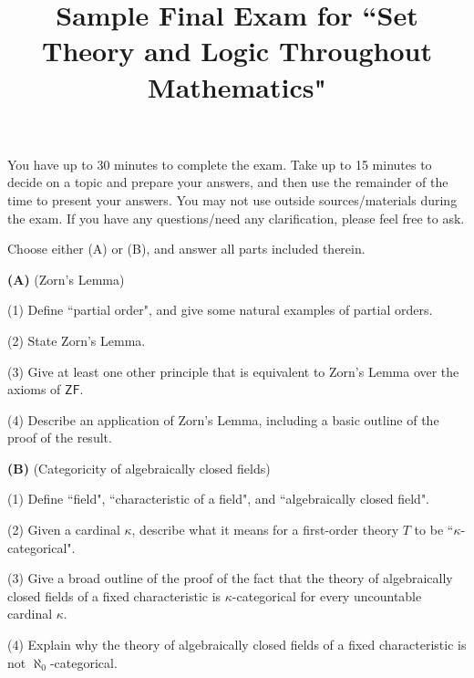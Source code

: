 \documentclass{amsart}
\begin{document}
\title{Sample Final Exam for ``Set Theory and Logic Throughout Mathematics"}
\maketitle

You have up to 30 minutes to complete the exam. Take up to 15 minutes to decide 
on a topic and prepare your answers, and then use the remainder of the time to 
present your answers. You may not use outside sources/materials during the exam.
If you have any questions/need any clarification, please feel free to ask.

\bigskip

Choose either (A) or (B), and answer all parts included therein.

\bigskip

\noindent \textbf{(A)} (Zorn's Lemma)

\smallskip

(1) Define ``partial order", and give some natural examples of partial orders.

\smallskip

(2) State Zorn's Lemma.

\smallskip

(3) Give at least one other principle that is equivalent to Zorn's Lemma over the axioms of $\mathsf{ZF}$.

\smallskip

(4) Describe an application of Zorn's Lemma, including a basic outline of the proof of the result.

\bigskip

\noindent \textbf{(B)} (Categoricity of algebraically closed fields)

\smallskip

(1) Define ``field", ``characteristic of a field", and ``algebraically closed field".

\smallskip

(2) Given a cardinal $\kappa$, describe what it means for a first-order theory $T$ to be 
``$\kappa$-categorical".

\smallskip

(3) Give a broad outline of the proof of the fact that the theory of algebraically closed fields 
of a fixed characteristic is $\kappa$-categorical for every uncountable cardinal $\kappa$.

\smallskip

(4) Explain why the theory of algebraically closed fields of a fixed characteristic is not 
$\aleph_0$-categorical.
\end{document}
